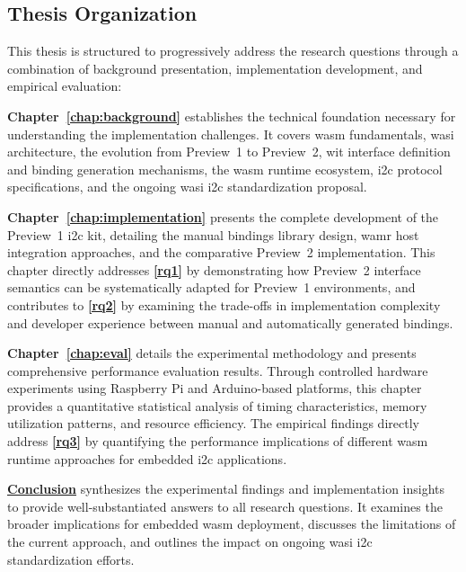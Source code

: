 \subsection*{Thesis Organization}
\label{subsec:thesis-organization}

This thesis is structured to progressively address the research questions through a combination of background presentation, implementation development, and empirical evaluation:

\textbf{Chapter~\ref{chap:background}} establishes the technical foundation necessary for understanding the implementation challenges. It covers \acrshort{wasm} fundamentals, \acrshort{wasi} architecture, the evolution from Preview~1 to Preview~2, \acrshort{wit} interface definition and binding generation mechanisms, the \acrshort{wasm} runtime ecosystem, \acrshort{i2c} protocol specifications, and the ongoing \acrshort{wasi} \acrshort{i2c} standardization proposal.

\textbf{Chapter~\ref{chap:implementation}} presents the complete development of the Preview~1 \acrshort{i2c} kit, detailing the manual bindings library design, \acrshort{wamr} host integration approaches, and the comparative Preview~2 implementation. This chapter directly addresses \textbf{\autoref{rq1}} by demonstrating how Preview~2 interface semantics can be systematically adapted for Preview~1 environments, and contributes to \textbf{\autoref{rq2}} by examining the trade-offs in implementation complexity and developer experience between manual and automatically generated bindings.

\textbf{Chapter~\ref{chap:eval}} details the experimental methodology and presents comprehensive performance evaluation results. Through controlled hardware experiments using Raspberry Pi and Arduino-based platforms, this chapter provides a quantitative statistical analysis of timing characteristics, memory utilization patterns, and resource efficiency. The empirical findings directly address \textbf{\autoref{rq3}} by quantifying the performance implications of different \acrshort{wasm} runtime approaches for embedded \acrshort{i2c} applications.

\textbf{\hyperref[chap:conclusion]{Conclusion}} synthesizes the experimental findings and implementation insights to provide well-substantiated answers to all research questions. It examines the broader implications for embedded \acrshort{wasm} deployment, discusses the limitations of the current approach, and outlines the impact on ongoing \acrshort{wasi} \acrshort{i2c} standardization efforts.


